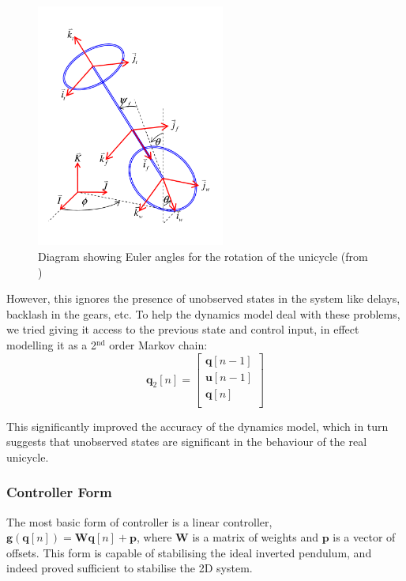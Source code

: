 \documentclass{IIBproject}
\begin{document}
\begin{figure}[htbp]
  \begin{center}
    \includegraphics[height=8cm]{figures/angles.pdf}
    \end{center}
    \caption{Diagram showing Euler angles for the rotation of the unicycle
    (from \cite{ref:forster})}
    \label{fig:unicycle_angles}
    \end{figure}

However, this ignores the presence of unobserved states in the system like
delays, backlash in the gears, etc. To help the dynamics model deal with these
problems, we tried giving it access to the previous state and control input,
in effect modelling it as a 2$^\textrm{nd}$ order Markov chain:
\[
  \boldsymbol{q}_2[n] = \left[ \begin{array}{l}
    \boldsymbol{q}[n-1] \\
    \boldsymbol{u}[n-1] \\
    \boldsymbol{q}[n] \\
  \end{array} \right]
\]

This significantly improved the accuracy of the dynamics model, which in turn
suggests that unobserved states are significant in the behaviour of the real
unicycle. 

\subsubsection{Controller Form}

The most basic form of controller is a linear controller,
$\boldsymbol{g}(\boldsymbol{q}[n]) = \boldsymbol{W} \boldsymbol{q}[n] +
\boldsymbol{p}$, where $\boldsymbol{W}$ is a matrix of weights and
$\boldsymbol{p}$ is a vector of offsets. This form is capable of stabilising
the ideal inverted pendulum, and indeed proved sufficient to stabilise the 2D
system.
\end{document}
